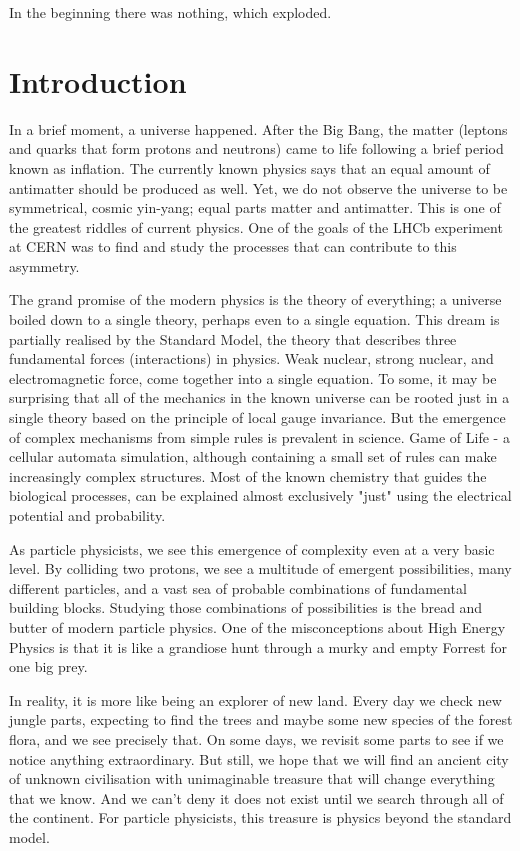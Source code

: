 \begin{savequote}[75mm]
In the beginning there was nothing, which exploded.
\end{savequote}

\chapter{Introduction}
\label{introduction}

In a brief moment, a universe happened.
After the Big Bang, the matter (leptons and quarks that form protons and neutrons) came to life following a brief period known as inflation.
The currently known physics says that an equal amount of antimatter should be produced as well.
Yet, we do not observe the universe to be symmetrical, cosmic yin-yang; equal parts matter and antimatter.
This is one of the greatest riddles of current physics.
One of the goals of the LHCb experiment at CERN was to find and study the processes that can contribute to this asymmetry.

The grand promise of the modern physics is the theory of everything; a universe boiled down to a single theory, perhaps even to a single equation.
This dream is partially realised by the Standard Model, the theory that describes three fundamental forces (interactions) in physics.
Weak nuclear, strong nuclear, and electromagnetic force, come together into a single equation.
To some, it may be surprising that all of the mechanics in the known universe can be rooted just in a single theory based on the principle of local gauge invariance.
But the emergence of complex mechanisms from simple rules is prevalent in science.
Game of Life - a cellular automata simulation, although containing a small set of rules can make increasingly complex structures.
Most of the known chemistry that guides the biological processes, can be explained almost exclusively "just" using the electrical potential and probability.

As particle physicists, we see this emergence of complexity even at a very basic level.
By colliding two protons, we see a multitude of emergent possibilities, many different particles, and a vast sea of probable combinations of fundamental building blocks.
Studying those combinations of possibilities is the bread and butter of modern particle physics.
One of the misconceptions about High Energy Physics is that it is like a grandiose hunt through a murky and empty Forrest for one big prey.

In reality, it is more like being an explorer of new land.
Every day we check new jungle parts, expecting to find the trees and maybe some new species of the forest flora, and we see precisely that.
On some days, we revisit some parts to see if we notice anything extraordinary.
But still, we hope that we will find an ancient city of unknown civilisation with unimaginable treasure that will change everything that we know.
And we can't deny it does not exist until we search through all of the continent.
For particle physicists, this treasure is physics beyond the standard model.

